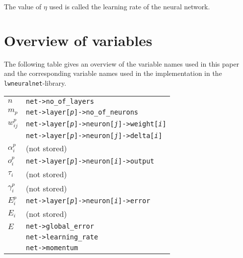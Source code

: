 \documentclass{article}
\newcommand{\fskip}{3pt}
\newcommand{\act}[2]{\alpha^{#1}_{#2}}
\newcommand{\out}[2]{o^{#1}_{#2}}
\newcommand{\wgt}[3]{w^{#1}_{{#2}{#3}}}
\newcommand{\dff}[2]{\gamma^{#1}_{#2}}
\newcommand{\err}[2]{E^{#1}_{#2}}
\newcommand{\tar}[1]{\tau_{#1}}
\newcommand{\ger}{E}
\newcommand{\oer}[1]{E_{#1}}
\begin{document}
The value of $\eta$ used is called the learning rate of the neural network.

\section{Overview of variables}

The following table gives an overview of the variable names used in this paper
and the corresponding variable names used in the implementation in the {\tt
lwneuralnet}-library.
\begin{center}
\begin{tabular}{|l|l|}
  \hline
  $n$             & {\tt net->no\_of\_layers} \\[\fskip]
  $m_p$           & {\tt net->layer[{\it p}]->no\_of\_neurons} \\[\fskip]
  $\wgt{p}{i}{j}$ & {\tt net->layer[{\it p}]->neuron[{\it j}]->weight[{\it i}]}
                    \\[\fskip]
                  & {\tt net->layer[{\it p}]->neuron[{\it j}]->delta[{\it i}]}
                    \\[\fskip]
  $\act{p}{i}$    & (not stored) \\[\fskip]
  $\out{p}{i}$    & {\tt net->layer[{\it p}]->neuron[{\it i}]->output} \\[\fskip]
  $\tar{i}$       & (not stored) \\[\fskip]
  $\dff{p}{i}$    & (not stored) \\[\fskip]
  $\err{p}{i}$    & {\tt net->layer[{\it p}]->neuron[{\it i}]->error} \\[\fskip]
  $\oer{i}$	  & (not stored) \\[\fskip]
  $\ger$          & {\tt net->global\_error} \\[\fskip]
                  & {\tt net->learning\_rate} \\[\fskip]
	          & {\tt net->momentum} \\[\fskip]
  \hline
\end{tabular}
\end{center}
\end{document}
